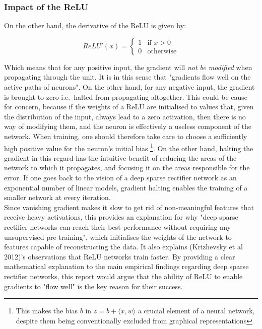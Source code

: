 \documentclass[a4paper,11pt]{article}
\begin{document}
\subsubsection{Impact of the ReLU}

On the other hand, the derivative of the ReLU is given by:

\begin{equation}
ReLU'(x) = \begin{cases} 1 & \mbox{if } x > 0\\ 
				  0 & \mbox{otherwise} \end{cases}
\end{equation} 

Which means that for any positive input, the gradient will \textit{not be modified} when propagating through the unit. It is in this sense that "gradients flow well on the active paths of neurons". On the other hand, for any negative input, the gradient is brought to zero i.e.\ halted from propagating altogether. This could be cause for concern, because if the weights of a ReLU are initialised to values that, given the distribution of the input, always lead to a zero activation, then there is no way of modifying them, and the neuron is effectively a useless component of the network. When training, one should therefore take care to choose a sufficiently high positive value for the neuron's initial bias \footnote{This makes the bias $b$ in $z = b + \langle x, w \rangle$ a crucial element of a neural network, despite them being conventionally excluded from graphical representations}. On the other hand, halting the gradient in this regard has the intuitive benefit of reducing the areas of the network to which it propagates, and focusing it on the areas responsible for the error. If one goes back to the vision of a deep sparse rectifier network as an exponential number of linear models, gradient halting enables the training of a smaller network at every iteration. \\

Since vanishing gradient makes it slow to get rid of non-meaningful features that receive heavy activations, this provides an explanation for why "deep sparse rectifier networks can reach their best performance without requiring any unsupervised pre-training", which initialises the weights of the network to features capable of reconstructing the data. It also explains (Krizhevsky et al 2012)'s observations that ReLU networks train faster. By providing a clear mathematical explanation to the main empirical findings regarding deep sparse rectifier networks, this report would argue that the ability of ReLU to enable gradients to "flow well" is the key reason for their success. \\
\end{document}
